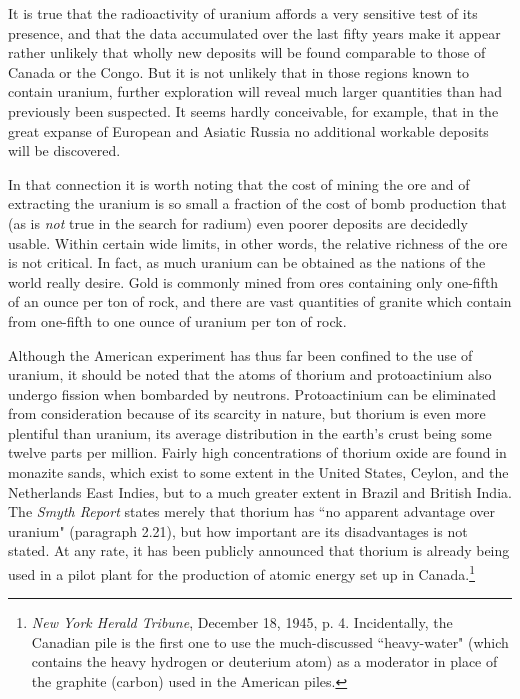 It is true that the radioactivity of uranium affords a very sensitive test of its presence, and that the data accumulated over the last fifty years make it appear rather unlikely that wholly new deposits will be found comparable to those of Canada or the Congo. But it is not unlikely that in those regions known to contain uranium, further exploration will reveal much larger quantities than had previously been suspected. It seems hardly conceivable, for example, that in the great expanse of European and Asiatic Russia no additional workable deposits will be discovered.

In that connection it is worth noting that the cost of mining the ore and of extracting the uranium is so small a fraction of the cost of bomb production that (as is \emph{not} true in the search for radium) even poorer deposits are decidedly usable. Within certain wide limits, in other words, the relative richness of the ore is not critical. In fact, as much uranium can be obtained as the nations of the world really desire. Gold is commonly mined from ores containing only one-fifth of an ounce per ton of rock, and there are vast quantities of granite which contain from one-fifth to one ounce of uranium per ton of rock.

Although the American experiment has thus far been confined to the use of uranium, it should be noted that the atoms of thorium and protoactinium also undergo fission when bombarded by neutrons. Protoactinium can be eliminated from consideration because of its scarcity in nature, but thorium is even more plentiful than uranium, its average distribution in the earth's crust being some twelve parts per million. Fairly high concentrations of thorium oxide are found in monazite sands, which exist to some extent in the United States, Ceylon, and the Netherlands East Indies, but to a much greater extent in Brazil and British India. The \emph{Smyth Report} states merely that thorium has ``no apparent advantage over uranium" (paragraph 2.21), but how important are its disadvantages is not stated. At any rate, it has been publicly announced that thorium is already being used in a pilot plant for the production of atomic energy set up in Canada.\footnote{\textit{New York Herald Tribune}, December 18, 1945, p. 4. Incidentally, the Canadian pile is the first one to use the much-discussed ``heavy-water" (which contains the heavy hydrogen or deuterium atom) as a moderator in place of the graphite (carbon) used in the American piles.}

